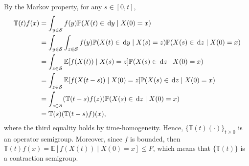 By the Markov property, for any \(s\in[0,t]\), 
\begin{align*}
	\mathbb T(t)f(x)&=\int_{y\in\mathcal{S}} f(y) \mathbb P(X(t)\in\, \mathrm{d} y \mid X(0)=x)
	\\&=\int_{y\in\mathcal{S}}\int_{z\in\mathcal S}f(y) \mathbb P(X(t)\in\, \mathrm{d} y\mid X(s)=z) \mathbb P(X(s)\in\, \mathrm{d} z\mid X(0)=x)
	\\&=\int_{z\in\mathcal S}\mathbb E[f(X(t))\mid X(s)=z] \mathbb P(X(s)\in\, \mathrm{d} z\mid X(0)=x)
	\\&=\int_{z\in\mathcal S} \mathbb E[f(X(t-s))\mid X(0)=z]\mathbb P(X(s)\in\, \mathrm{d} z\mid X(0)=x)
	\\&=\int_{z\in\mathcal S} (\mathbb T(t-s)f(z))\mathbb P(X(s)\in\, \mathrm{d} z\mid X(0)=x)
	\\&=\mathbb T(s) (\mathbb T(t-s)f)(x),
\end{align*}
where the third equality holds by time-homogeneity. Hence, \(\{\mathbb T(t)(\cdot)\}_{t\geq 0}\) is an operator semigroup. Moreover, since \(f\) is bounded, then \(\mathbb T(t)f(x) = \mathbb E[f(X(t))\mid X(0)=x] \leq F\), which means that \(\{\mathbb T(t)\}\) is a contraction semigroup.


